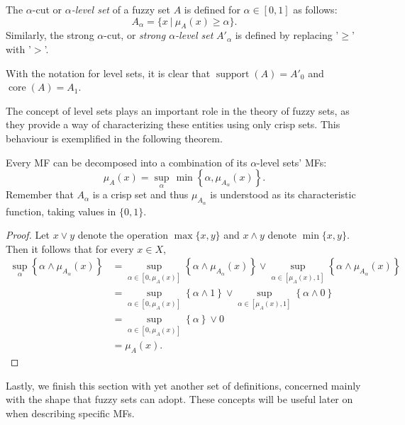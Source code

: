 \begin{definition} The $\alpha$-cut or \textit{$\alpha$-level set} of a fuzzy set $A$ is defined for $\alpha \in [0,1]$ as follows:
\[
A_\alpha = \{ x \ | \ \mu_A(x) \ge \alpha \}.
\]
Similarly, the strong $\alpha$-cut, or \textit{strong $\alpha$-level set} $A'_\alpha$ is defined by replacing '$\ge$' with '$>$'.

\end{definition}

\begin{remark} With the notation for level sets, it is clear that $\operatorname{support}(A) = A'_0$ and $\operatorname{core}(A) = A_1$.

\end{remark}

The concept of level sets plays an important role in the theory of fuzzy sets, as they provide a way of characterizing these entities using only crisp sets. This behaviour is exemplified in the following theorem.

\begin{theorem} Every MF can be decomposed into a combination of its $\alpha$-level sets' MFs:
\[
\mu_A(x) = \sup_\alpha \, \min \left\{ \alpha, \mu_{A_\alpha}(x) \right\}.
\]
Remember that $A_\alpha$ is a crisp set and thus $\mu_{A_\alpha}$ is understood as its characteristic function, taking values in $\{0,1\}$.
\end{theorem}
\begin{proof}
  Let $x \lor y$ denote the operation $\max \{x,y\}$ and $x \land y$ denote $\min\{x,y\}$. Then it follows that for every $x\in X$,
  \begin{align*}
    \sup_\alpha \left\{ \alpha \land \mu_{A_\alpha}(x) \right\} &= \sup_{\alpha \in [0,\mu_A(x)]} \left\{ \alpha \land \mu_{A_\alpha}(x) \right\} \lor \sup_{\alpha \in [\mu_A(x), 1]} \left\{ \alpha \land \mu_{A_\alpha}(x) \right\}\\
    &= \sup_{\alpha \in [0,\mu_A(x)]} \left\{ \alpha \land 1 \right\} \lor \sup_{\alpha \in [\mu_A(x), 1]} \left\{ \alpha \land 0 \right\}\\
    &= \sup_{\alpha \in [0,\mu_A(x)]} \left\{ \alpha  \right\} \lor 0\\
    &= \mu_A(x).
  \end{align*}

\end{proof}

Lastly, we finish this section with yet another set of definitions, concerned mainly with the shape that fuzzy sets can adopt. These concepts will be useful later on when describing specific MFs.

